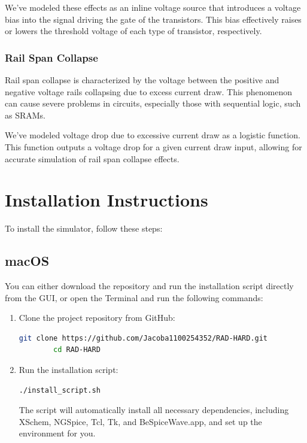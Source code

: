 \documentclass[12pt]{article}
\begin{document}
    We've modeled these effects as an inline voltage source that introduces a voltage bias into the signal driving the gate of the transistors.
    This bias effectively raises or lowers the threshold voltage of each type of transistor, respectively.

    \subsubsection{Rail Span Collapse}
    Rail span collapse is characterized by the voltage between the positive and negative voltage rails collapsing due to excess current draw.
    This phenomenon can cause severe problems in circuits, especially those with sequential logic, such as SRAMs.

    We've modeled voltage drop due to excessive current draw as a logistic function.
    This function outputs a voltage drop for a given current draw input, allowing for accurate simulation of rail span collapse effects.


    \section{Installation Instructions}\label{sec:installation-instructions}
    To install the simulator, follow these steps:

    \subsection{macOS}\label{subsec:installation-macos}
    You can either download the repository and run the installation script directly from the GUI, or open the Terminal and run the following commands:
    \begin{enumerate}
        \item Clone the project repository from GitHub:
        \begin{lstlisting}[language=bash,label={lst:lstlisting}]
        git clone https://github.com/Jacoba1100254352/RAD-HARD.git
        cd RAD-HARD
        \end{lstlisting}

        \item Run the installation script:
        \begin{lstlisting}[language=bash,label={lst:lstlisting2}]
        ./install_script.sh
        \end{lstlisting}

        The script will automatically install all necessary dependencies, including XSchem, NGSpice, Tcl, Tk, and BeSpiceWave.app, and set up the environment for you.
    \end{enumerate}
\end{document}
